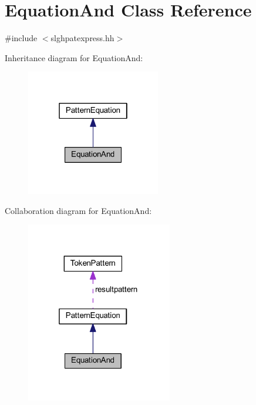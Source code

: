 \hypertarget{class_equation_and}{}\section{Equation\+And Class Reference}
\label{class_equation_and}


{\ttfamily \#include $<$slghpatexpress.\+hh$>$}



Inheritance diagram for Equation\+And\+:
\nopagebreak
\begin{figure}[H]
\begin{center}
\leavevmode
\includegraphics[width=166pt]{class_equation_and__inherit__graph}
\end{center}
\end{figure}


Collaboration diagram for Equation\+And\+:
\nopagebreak
\begin{figure}[H]
\begin{center}
\leavevmode
\includegraphics[width=181pt]{class_equation_and__coll__graph}
\end{center}
\end{figure}

